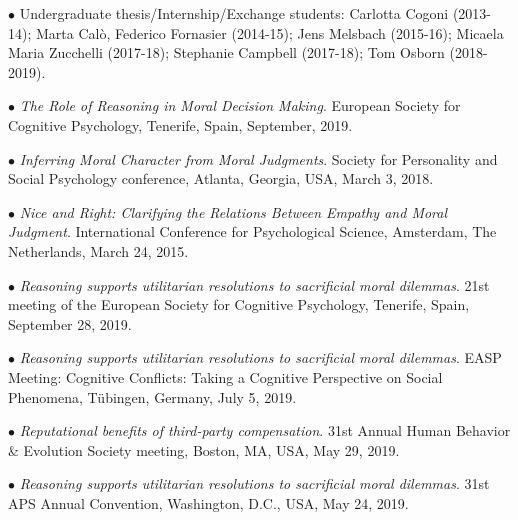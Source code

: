 \documentclass[10pt]{article}
\begin{document}
	$\bullet$ Undergraduate thesis/Internship/Exchange students: Carlotta Cogoni (2013-14); Marta Cal\`{o}, Federico \hspace*{0.1in}Fornasier (2014-15); Jens Melsbach (2015-16); Micaela Maria Zucchelli (2017-18); Stephanie Campbell \hspace*{0.1in}(2017-18); Tom Osborn (2018-2019).
	

	$\bullet$ \textit{The Role of Reasoning in Moral Decision Making}. European Society for Cognitive Psychology, Tenerife, \hspace*{0.1in}Spain, September, 2019.
    \miniskip
	
	$\bullet$ \textit{Inferring Moral Character from Moral Judgments}. Society for Personality and Social Psychology conference, \hspace*{0.1in}Atlanta, Georgia, USA, March 3, 2018.
	\miniskip
	
	$\bullet$ \textit{Nice and Right: Clarifying the Relations Between Empathy and Moral Judgment}. International Conference for \hspace*{0.1in}Psychological Science, Amsterdam, The Netherlands, March 24, 2015.
	\miniskip
	

	$\bullet$ \textit{Reasoning supports utilitarian resolutions to sacrificial moral dilemmas}. 21st meeting of the European \hspace*{0.1in}Society for Cognitive Psychology, Tenerife, Spain, September 28, 2019.\\
	\miniskip

	$\bullet$ \textit{Reasoning supports utilitarian resolutions to sacrificial moral dilemmas}. EASP Meeting: Cognitive Conflicts: \hspace*{0.1in}Taking a Cognitive Perspective on Social Phenomena, Tübingen, Germany, July 5, 2019.\\
	\miniskip

    $\bullet$ \textit{Reputational benefits of third-party compensation}. 31st Annual Human Behavior \& Evolution Society \hspace*{0.1in}meeting, Boston, MA, USA, May 29, 2019.\\
	\miniskip

	$\bullet$ \textit{Reasoning supports utilitarian resolutions to sacrificial moral dilemmas}. 31st APS Annual Convention, \hspace*{0.1in}Washington, D.C., USA, May 24, 2019.\\
	\miniskip
\end{document}

